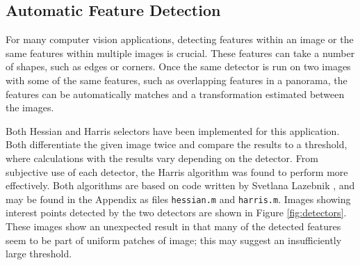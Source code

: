 \documentclass[a4paper, 10pt, conference]{ieeeconf}
\begin{document}
\subsection{Automatic Feature Detection}

For many computer vision applications, detecting features within an image or the same features within multiple images is crucial. These features can take a number of shapes, such as edges or corners. Once the same detector is run on two images with some of the same features, such as overlapping features in a panorama, the features can be automatically matches and a transformation estimated between the images.

Both Hessian and Harris selectors have been implemented for this application. Both differentiate the given image twice and compare the results to a threshold, where calculations with the results vary depending on the detector. From subjective use of each detector, the Harris algorithm was found to perform more effectively. Both algorithms are based on code written by Svetlana Lazebnik \cite{harrisdetector}, and may be found in the Appendix as files \texttt{hessian.m} and \texttt{harris.m}. Images showing interest points detected by the two detectors are shown in Figure \ref{fig:detectors}. These images show an unexpected result in that many of the detected features seem to be part of uniform patches of image; this may suggest an insufficiently large threshold.
\end{document}
